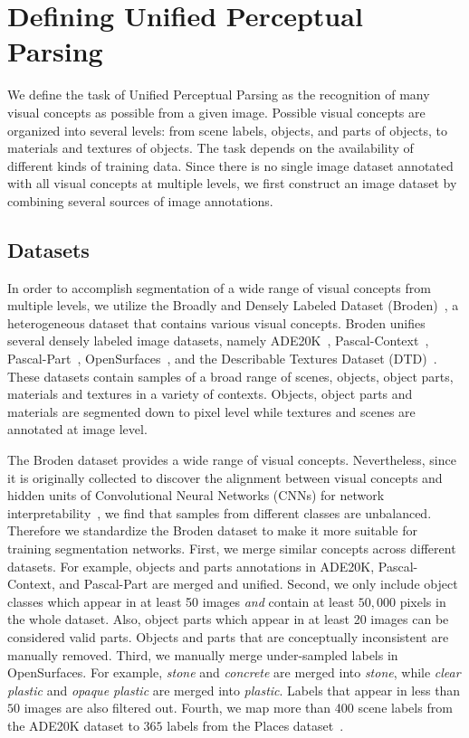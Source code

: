 \documentclass[runningheads]{llncs}
\begin{document}
\section{Defining Unified Perceptual Parsing}

We define the task of Unified Perceptual Parsing as the recognition of many visual concepts as possible from a given image. Possible visual concepts are organized into several levels: from scene labels, objects, and parts of objects, to materials and textures of objects. The task depends on the availability of different kinds of training data. Since there is no single image dataset annotated with all visual concepts at multiple levels, we first construct an image dataset by combining several sources of image annotations. 

\subsection{Datasets}

In order to accomplish segmentation of a wide range of visual concepts from multiple levels, we utilize the Broadly and Densely Labeled Dataset (Broden)~\cite{netdissect2017}, a heterogeneous dataset that contains various visual concepts. Broden unifies several densely labeled image datasets, namely ADE20K~\cite{zhou2017scene}, Pascal-Context~\cite{mottaghi_cvpr14}, Pascal-Part~\cite{chen_cvpr14}, OpenSurfaces~\cite{bell2013opensurfaces}, and the Describable Textures Dataset (DTD)~\cite{cimpoi2014describing}. These datasets contain samples of a broad range of scenes, objects, object parts, materials and textures in a variety of contexts. Objects, object parts and materials are segmented down to pixel level while textures and scenes are annotated at image level. 

The Broden dataset provides a wide range of visual concepts. Nevertheless, since it is originally collected to discover the alignment between visual concepts and hidden units of Convolutional Neural Networks (CNNs) for network interpretability~\cite{netdissect2017,netdissect2018}, we find that samples from different classes are unbalanced. Therefore we standardize the Broden dataset to make it more suitable for training segmentation networks. First, we merge similar concepts across different datasets. For example, objects and parts annotations in ADE20K, Pascal-Context, and Pascal-Part are merged and unified. Second, we only include object classes which appear in at least 50 images \emph{and} contain at least $50,000$ pixels in the whole dataset. Also, object parts which appear in at least 20 images can be considered valid parts. Objects and parts that are conceptually inconsistent are manually removed. Third, we manually merge under-sampled labels in OpenSurfaces. For example, \textit{stone} and \textit{concrete} are merged into \textit{stone}, while \textit{clear plastic} and \textit{opaque plastic} are merged into \textit{plastic}. Labels that appear in less than $50$ images are also filtered out. Fourth, we map more than 400 scene labels from the ADE20K dataset to $365$ labels from the Places dataset~\cite{zhou2014learning}. 
\end{document}
